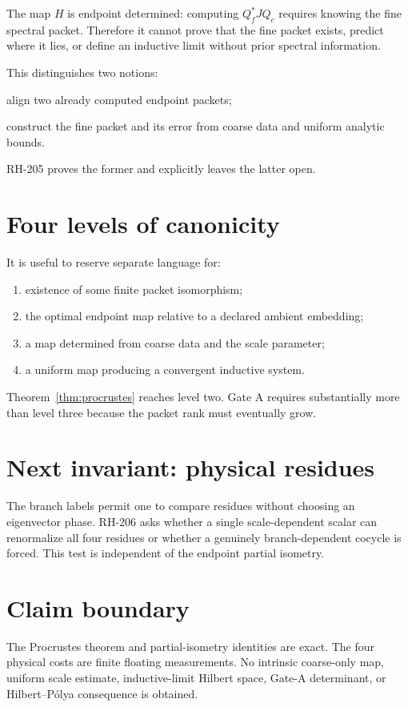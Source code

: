 \documentclass[12pt]{article}
\theoremstyle{remark}\newtheorem{remark}[theorem]{Remark}
\begin{document}
The map $H$ is endpoint determined: computing $Q_f^*JQ_c$ requires knowing
the fine spectral packet.  Therefore it cannot prove that the fine packet
exists, predict where it lies, or define an inductive limit without prior
spectral information.

This distinguishes two notions:
\begin{description}[leftmargin=2.5em,style=nextline]
\item[Retrospective transport] align two already computed endpoint packets;
\item[Predictive renormalization] construct the fine packet and its error
from coarse data and uniform analytic bounds.
\end{description}
RH-205 proves the former and explicitly leaves the latter open.

\section{Four levels of canonicity}

It is useful to reserve separate language for:
\begin{enumerate}[leftmargin=2em]
\item existence of some finite packet isomorphism;
\item the optimal endpoint map relative to a declared ambient embedding;
\item a map determined from coarse data and the scale parameter;
\item a uniform map producing a convergent inductive system.
\end{enumerate}
Theorem~\ref{thm:procrustes} reaches level two.  Gate A requires substantially
more than level three because the packet rank must eventually grow.

\section{Next invariant: physical residues}

The branch labels permit one to compare residues without choosing an
eigenvector phase.  RH-206 asks whether a single scale-dependent scalar can
renormalize all four residues or whether a genuinely branch-dependent
cocycle is forced.  This test is independent of the endpoint partial
isometry.

\section{Claim boundary}

The Procrustes theorem and partial-isometry identities are exact.  The four
physical costs are finite floating measurements.  No intrinsic coarse-only
map, uniform scale estimate, inductive-limit Hilbert space, Gate-A
determinant, or Hilbert--P\'olya consequence is obtained.


\end{document}
